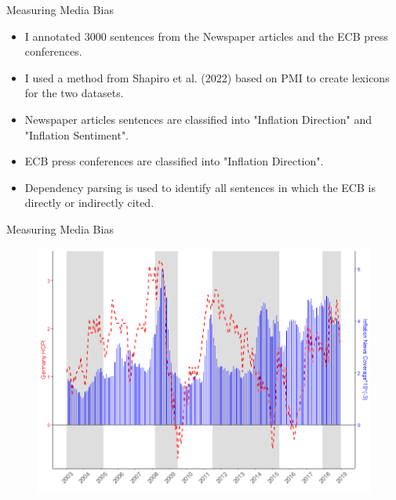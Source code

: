 \documentclass[aspectratio=169,xcolor=dvipsnames]{beamer}
\begin{document}

\begin{frame}{Measuring Media Bias}

\begin{itemize}
	\item I annotated 3000 sentences from the Newspaper articles and the ECB press conferences.
	\item I used a method from Shapiro et al. (2022) based on PMI to create lexicons for the two datasets.
	\item Newspaper articles sentences are classified into "Inflation Direction" and "Inflation Sentiment".
	\item ECB press conferences are classified into "Inflation Direction".
	\item Dependency parsing is used to identify all sentences in which the ECB is directly or indirectly cited.
\end{itemize}

\end{frame}


\begin{frame}{Measuring Media Bias}

 \begin{figure}[!ht]
    \centering
    \includegraphics{Inflation_Count.png}
    \end{figure}

\end{frame}
\end{document}
